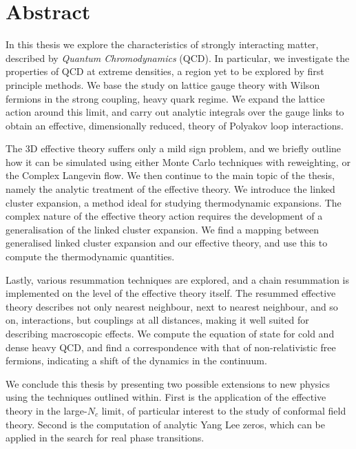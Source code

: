 \chapter*{Abstract}
{\fontsize{12pt}{18pt}\selectfont

In this thesis we explore the characteristics of strongly interacting matter,
described by \emph{Quantum Chromodynamics} (QCD). In particular, we investigate
the properties of QCD at extreme densities, a region yet to be explored by first
principle methods. We base the study on lattice gauge theory with Wilson
fermions in the strong coupling, heavy quark regime. We expand the lattice
action around this limit, and carry out analytic integrals over the gauge links
to obtain an effective, dimensionally reduced, theory of Polyakov loop
interactions.

The 3D effective theory suffers only a mild sign problem, and we briefly outline
how it can be simulated using either Monte Carlo techniques with reweighting, or
the Complex Langevin flow. We then continue to the main topic of the thesis,
namely the analytic treatment of the effective theory. We introduce the linked
cluster expansion, a method ideal for studying thermodynamic expansions.  The
complex nature of the effective theory action requires the development of a
generalisation of the linked cluster expansion.  We find a mapping between
generalised linked cluster expansion and our effective theory, and use this to
compute the thermodynamic quantities.

Lastly, various resummation techniques are explored, and a chain resummation is
implemented on the level of the effective theory itself. The resummed effective
theory describes not only nearest neighbour, next to nearest
neighbour, and so on, interactions, but couplings at all distances, making it
well suited for describing macroscopic effects. We compute the equation of state
for cold and dense heavy QCD, and find a correspondence with that of
non-relativistic free fermions, indicating a shift of the dynamics in the
continuum.

We conclude this thesis by presenting two possible extensions to new physics
using the techniques outlined within. First is the application of the effective
theory in the large-$N_c$ limit, of particular interest to the study of
conformal field theory. Second is the computation of analytic Yang Lee zeros,
which can be applied in the search for real phase transitions.

}
